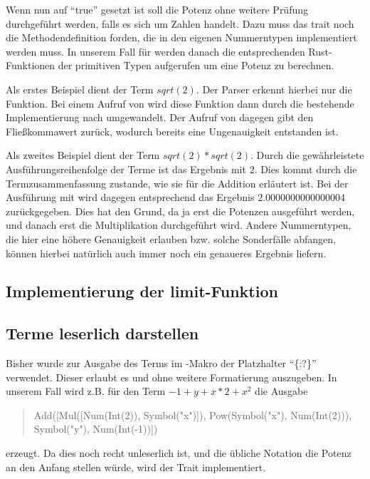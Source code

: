 \documentclass[11pt,a4paper, ngerman]{article}
\begin{document}
Wenn nun  auf ``true'' gesetzt ist soll die Potenz ohne weitere Prüfung durchgeführt werden, falls es sich um Zahlen handelt. Dazu muss das trait  noch die Methodendefinition  forden, die in den eigenen Nummerntypen implementiert werden muss. In unserem Fall für  werden danach die entsprechenden Rust-Funktionen der primitiven Typen aufgerufen um eine Potenz zu berechnen.

Als erstes Beispiel dient der Term $sqrt(2)$. Der Parser erkennt hierbei nur die Funktion. Bei einem Aufruf von  wird diese Funktion dann durch die bestehende Implementierung nach  umgewandelt. Der Aufruf von  dagegen gibt den Fließkommawert  zurück, wodurch bereits eine Ungenauigkeit entstanden ist.

Als zweites Beispiel dient der Term $sqrt(2)*sqrt(2)$. Durch die gewährleistete Ausführungsreihenfolge der Terme ist das Ergebnis mit  $2$. Dies kommt durch die Termzusammenfassung zustande, wie sie für die Addition erläutert ist. Bei der Ausführung mit  wird dagegen entsprechend das Ergebnis $2.0000000000000004$ zurückgegeben. Dies hat den Grund, da ja erst die Potenzen ausgeführt werden, und danach erst die Multiplikation durchgeführt wird. Andere Nummerntypen, die hier eine höhere Genauigkeit erlauben bzw. solche Sonderfälle abfangen, können hierbei natürlich auch immer noch ein genaueres Ergebnis liefern.

\subsection{Implementierung der limit-Funktion}
\subsection{Terme leserlich darstellen}
Bisher wurde zur Ausgabe des Terms im -Makro der Platzhalter ``\{:?\}'' verwendet. Dieser erlaubt es  und  ohne weitere Formatierung auszugeben. In unserem Fall wird z.B. für den Term $-1+y+x*2+x^2$ die Ausgabe
\begin{quote}
    Add([Mul([Num(Int(2)), Symbol("x")]), Pow(Symbol("x"), Num(Int(2))), Symbol("y"), Num(Int(-1))])
\end{quote}
erzeugt. Da dies noch recht unleserlich ist, und die übliche Notation die Potenz an den Anfang stellen würde, wird der Trait  implementiert.
\end{document}
